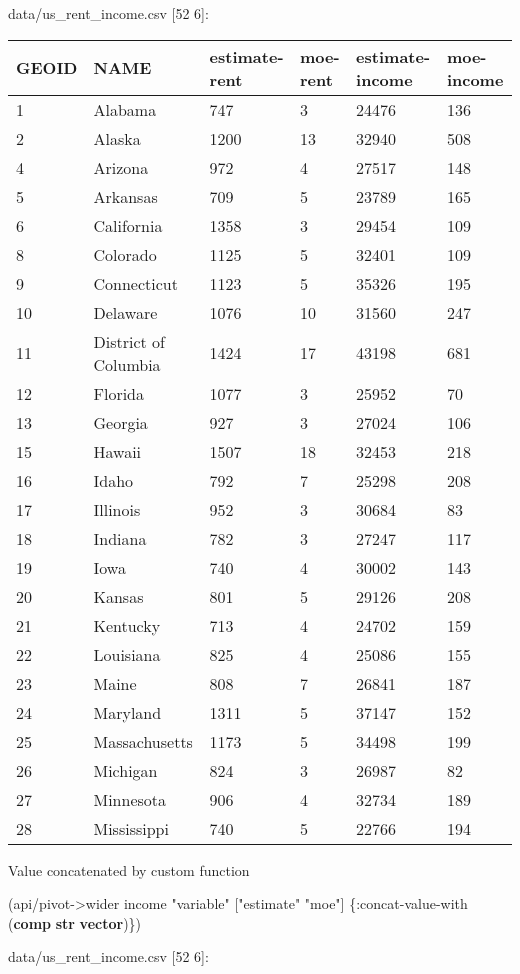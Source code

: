 \documentclass[]{article}
\newenvironment{Shaded}{\begin{snugshade}}{\end{snugshade}}
\newcommand{\KeywordTok}[1]{\textcolor[rgb]{0.13,0.29,0.53}{\textbf{#1}}}
\newcommand{\StringTok}[1]{\textcolor[rgb]{0.31,0.60,0.02}{#1}}
\newcommand{\AttributeTok}[1]{\textcolor[rgb]{0.77,0.63,0.00}{#1}}
\newcommand{\NormalTok}[1]{#1}
\begin{document}
data/us\_rent\_income.csv {[}52 6{]}:

\begin{longtable}[]{@{}llllll@{}}
\toprule
GEOID & NAME & estimate-rent & moe-rent & estimate-income &
moe-income\tabularnewline
\midrule
\endhead
1 & Alabama & 747 & 3 & 24476 & 136\tabularnewline
2 & Alaska & 1200 & 13 & 32940 & 508\tabularnewline
4 & Arizona & 972 & 4 & 27517 & 148\tabularnewline
5 & Arkansas & 709 & 5 & 23789 & 165\tabularnewline
6 & California & 1358 & 3 & 29454 & 109\tabularnewline
8 & Colorado & 1125 & 5 & 32401 & 109\tabularnewline
9 & Connecticut & 1123 & 5 & 35326 & 195\tabularnewline
10 & Delaware & 1076 & 10 & 31560 & 247\tabularnewline
11 & District of Columbia & 1424 & 17 & 43198 & 681\tabularnewline
12 & Florida & 1077 & 3 & 25952 & 70\tabularnewline
13 & Georgia & 927 & 3 & 27024 & 106\tabularnewline
15 & Hawaii & 1507 & 18 & 32453 & 218\tabularnewline
16 & Idaho & 792 & 7 & 25298 & 208\tabularnewline
17 & Illinois & 952 & 3 & 30684 & 83\tabularnewline
18 & Indiana & 782 & 3 & 27247 & 117\tabularnewline
19 & Iowa & 740 & 4 & 30002 & 143\tabularnewline
20 & Kansas & 801 & 5 & 29126 & 208\tabularnewline
21 & Kentucky & 713 & 4 & 24702 & 159\tabularnewline
22 & Louisiana & 825 & 4 & 25086 & 155\tabularnewline
23 & Maine & 808 & 7 & 26841 & 187\tabularnewline
24 & Maryland & 1311 & 5 & 37147 & 152\tabularnewline
25 & Massachusetts & 1173 & 5 & 34498 & 199\tabularnewline
26 & Michigan & 824 & 3 & 26987 & 82\tabularnewline
27 & Minnesota & 906 & 4 & 32734 & 189\tabularnewline
28 & Mississippi & 740 & 5 & 22766 & 194\tabularnewline
\bottomrule
\end{longtable}

Value concatenated by custom function

\begin{Shaded}
\begin{Highlighting}[]
\NormalTok{(api/pivot->wider income }\StringTok{"variable"}\NormalTok{ [}\StringTok{"estimate"} \StringTok{"moe"}\NormalTok{] \{}\AttributeTok{:concat-value-with}\NormalTok{ (}\KeywordTok{comp} \KeywordTok{str} \KeywordTok{vector}\NormalTok{)\})}
\end{Highlighting}
\end{Shaded}

data/us\_rent\_income.csv {[}52 6{]}:
\end{document}
